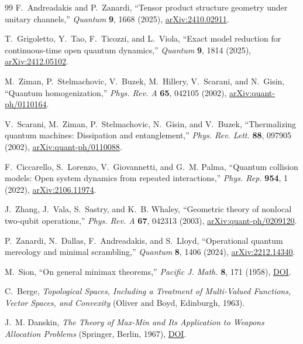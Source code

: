 \documentclass[11pt,a4paper]{article}
\theoremstyle{remark}
\begin{document}
\begin{thebibliography}{99}
F.~Andreadakis and P.~Zanardi,
``Tensor product structure geometry under unitary channels,''
\emph{Quantum} \textbf{9}, 1668 (2025),
\href{https://arxiv.org/abs/2410.02911}{arXiv:2410.02911}.

T.~Grigoletto, Y.~Tao, F.~Ticozzi, and L.~Viola,
``Exact model reduction for continuous-time open quantum dynamics,''
\emph{Quantum} \textbf{9}, 1814 (2025),
\href{https://arxiv.org/abs/2412.05102}{arXiv:2412.05102}.

M.~Ziman, P.~Stelmachovic, V.~Buzek, M.~Hillery, V.~Scarani, and N.~Gisin,
``Quantum homogenization,''
\emph{Phys. Rev. A} \textbf{65}, 042105 (2002),
\href{https://arxiv.org/abs/quant-ph/0110164}{arXiv:quant-ph/0110164}.

V.~Scarani, M.~Ziman, P.~Stelmachovic, N.~Gisin, and V.~Buzek,
``Thermalizing quantum machines: Dissipation and entanglement,''
\emph{Phys. Rev. Lett.} \textbf{88}, 097905 (2002),
\href{https://arxiv.org/abs/quant-ph/0110088}{arXiv:quant-ph/0110088}.

F.~Ciccarello, S.~Lorenzo, V.~Giovannetti, and G.~M. Palma,
``Quantum collision models: Open system dynamics from repeated
interactions,''
\emph{Phys. Rep.} \textbf{954}, 1 (2022),
\href{https://arxiv.org/abs/2106.11974}{arXiv:2106.11974}.

J.~Zhang, J.~Vala, S.~Sastry, and K.~B. Whaley,
``Geometric theory of nonlocal two-qubit operations,''
\emph{Phys. Rev. A} \textbf{67}, 042313 (2003),
\href{https://arxiv.org/abs/quant-ph/0209120}{arXiv:quant-ph/0209120}.

P.~Zanardi, N.~Dallas, F.~Andreadakis, and S.~Lloyd,
``Operational quantum mereology and minimal scrambling,''
\emph{Quantum} \textbf{8}, 1406 (2024),
\href{https://arxiv.org/abs/2212.14340}{arXiv:2212.14340}.

M.~Sion,
``On general minimax theorems,''
\emph{Pacific J. Math.} \textbf{8}, 171 (1958),
\href{https://doi.org/10.2140/pjm.1958.8.171}{DOI}.

C.~Berge,
\emph{Topological Spaces, Including a Treatment of Multi-Valued Functions,
Vector Spaces, and Convexity}
(Oliver and Boyd, Edinburgh, 1963).

J.~M. Danskin,
\emph{The Theory of Max-Min and Its Application to Weapons Allocation
Problems}
(Springer, Berlin, 1967),
\href{https://doi.org/10.1007/978-3-642-87661-6}{DOI}.

\end{thebibliography}
\end{document}
